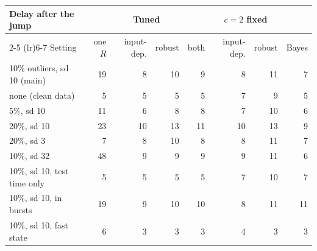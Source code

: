 \small
\setlength{\tabcolsep}{4pt}
\begin{tabular}{@{}lrrrrrrr@{}}
\toprule
Delay after the jump & \multicolumn{4}{c}{Tuned} & \multicolumn{2}{c}{$c = 2$ fixed} & \\
\cmidrule(lr){2-5} \cmidrule(lr){6-7}
Setting & one $R$ & input-dep. & robust & both & input-dep. & robust & Bayes \\
\midrule
10\% outliers, sd 10 (main) & 19 & 8 & 10 & 9 & 8 & 11 & 7 \\
none (clean data) & 5 & 5 & 5 & 5 & 7 & 9 & 5 \\
5\%, sd 10 & 11 & 6 & 8 & 8 & 7 & 10 & 6 \\
20\%, sd 10 & 23 & 10 & 13 & 11 & 10 & 13 & 9 \\
20\%, sd 3 & 7 & 8 & 10 & 8 & 8 & 11 & 7 \\
10\%, sd 32 & 48 & 9 & 9 & 9 & 9 & 11 & 6 \\
10\%, sd 10, test time only & 5 & 5 & 5 & 5 & 7 & 10 & 7 \\
10\%, sd 10, in bursts & 19 & 9 & 10 & 10 & 8 & 11 & 11 \\
10\%, sd 10, fast state & 6 & 3 & 3 & 3 & 4 & 3 & 3 \\
\bottomrule
\end{tabular}
